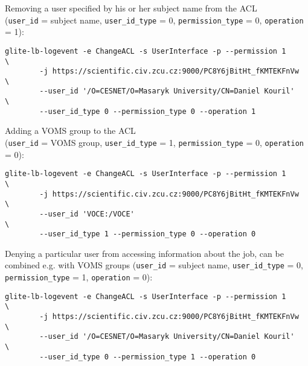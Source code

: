 Removing a user specified by his or her subject name from the ACL \\
(\verb'user_id' = subject name, \verb'user_id_type' = 0, 
\verb'permission_type' = 0, \verb'operation' = 1):

\begin{verbatim}
glite-lb-logevent -e ChangeACL -s UserInterface -p --permission 1       \
        -j https://scientific.civ.zcu.cz:9000/PC8Y6jBitHt_fKMTEKFnVw    \
        --user_id '/O=CESNET/O=Masaryk University/CN=Daniel Kouril'     \
        --user_id_type 0 --permission_type 0 --operation 1
\end{verbatim}


Adding a VOMS group to the ACL \\
(\verb'user_id' = VOMS group, \verb'user_id_type' = 1, 
\verb'permission_type' = 0, \verb'operation' = 0):

\begin{verbatim}
glite-lb-logevent -e ChangeACL -s UserInterface -p --permission 1       \
        -j https://scientific.civ.zcu.cz:9000/PC8Y6jBitHt_fKMTEKFnVw    \
        --user_id 'VOCE:/VOCE'                                          \
        --user_id_type 1 --permission_type 0 --operation 0
\end{verbatim}


Denying a particular user from accessing information about the job, can be
combined e.g. with VOMS groups (\verb'user_id' = subject name,
\verb'user_id_type' = 0, \verb'permission_type' = 1, \verb'operation' = 0):

\begin{verbatim}
glite-lb-logevent -e ChangeACL -s UserInterface -p --permission 1       \
        -j https://scientific.civ.zcu.cz:9000/PC8Y6jBitHt_fKMTEKFnVw    \
        --user_id '/O=CESNET/O=Masaryk University/CN=Daniel Kouril'     \
        --user_id_type 0 --permission_type 1 --operation 0
\end{verbatim}

